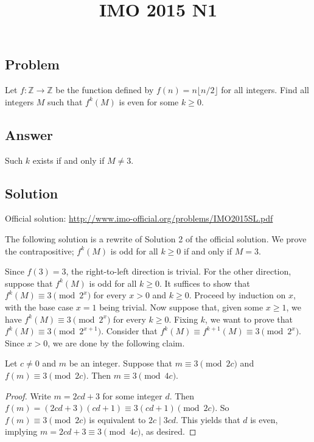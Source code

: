 \documentclass{article}
\title{IMO 2015 N1}
\author{}
\date{}
\newcommand{\Z}{\mathbb{Z}}
\begin{document}
\maketitle



\subsection*{Problem}

Let $f : \Z \to \Z$ be the function defined by $f(n) = n \lfloor n/2 \rfloor$ for all integers.
Find all integers $M$ such that $f^k(M)$ is even for some $k \geq 0$.



\subsection*{Answer}

Such $k$ exists if and only if $M \neq 3$.



\subsection*{Solution}

Official solution: \url{http://www.imo-official.org/problems/IMO2015SL.pdf}

The following solution is a rewrite of Solution 2 of the official solution.
We prove the contrapositive; $f^k(M)$ is odd for all $k \geq 0$ if and only if $M = 3$.

Since $f(3) = 3$, the right-to-left direction is trivial.
For the other direction, suppose that $f^k(M)$ is odd for all $k \geq 0$.
It suffices to show that $f^k(M) \equiv 3 \pmod{2^x}$ for every $x > 0$ and $k \geq 0$.
Proceed by induction on $x$, with the base case $x = 1$ being trivial.
Now suppose that, given some $x \geq 1$, we have $f^k(M) \equiv 3 \pmod{2^x}$ for every $k \geq 0$.
Fixing $k$, we want to prove that $f^k(M) \equiv 3 \pmod{2^{x + 1}}$.
Consider that $f^k(M) \equiv f^{k + 1}(M) \equiv 3 \pmod{2^x}$.
Since $x > 0$, we are done by the following claim.

\begin{claim}
Let $c \neq 0$ and $m$ be an integer.
Suppose that $m \equiv 3 \pmod{2c}$ and $f(m) \equiv 3 \pmod{2c}$.
Then $m \equiv 3 \pmod{4c}$.
\end{claim}
\begin{proof}
Write $m = 2cd + 3$ for some integer $d$.
Then $f(m) = (2cd + 3)(cd + 1) \equiv 3(cd + 1) \pmod{2c}$.
So $f(m) \equiv 3 \pmod{2c}$ is equivalent to $2c \mid 3cd$.
This yields that $d$ is even, implying $m = 2cd + 3 \equiv 3 \pmod{4c}$, as desired.
\end{proof}
\end{document}
